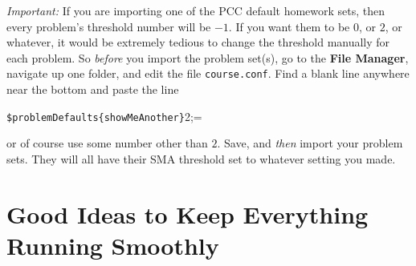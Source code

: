 \documentclass[12pt]{article}
\newcommand{\menu}[1]{\textbf{#1}}
\newcommand{\FM}{\menu{File Manager}}
\begin{document}
\emph{Important:} If you are importing one of the PCC default homework sets, then every problem's threshold number will be $-1$. If you want them to be $0$, or $2$, or whatever, it would be extremely tedious to change the threshold manually for each problem. So \emph{before} you import the problem set(s), go to the \FM, navigate up one folder, and edit the file \texttt{course.conf}. Find a blank line anywhere near the bottom and paste the line 
\begin{center}
\verb=$problemDefaults{showMeAnother}=2;=
\end{center}
or of course use some number other than $2$. Save, and \emph{then} import your problem sets. They will all have their SMA threshold set to whatever setting you made.

\section{Good Ideas to Keep Everything Running Smoothly}\label{goodideas}
\end{document}
